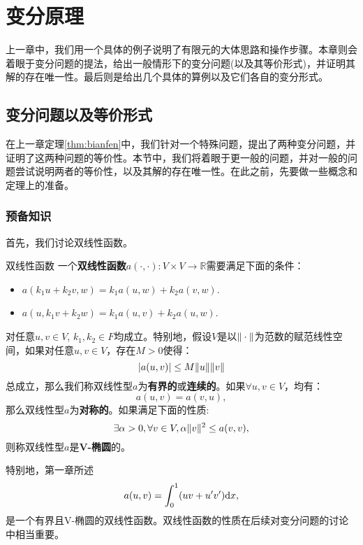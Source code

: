 
\chapter{变分原理}
上一章中，我们用一个具体的例子说明了有限元的大体思路和操作步骤。本章则会着眼于变分问题的提法，给出一般情形下的变分问题(以及其等价形式)，并证明其解的存在唯一性。最后则是给出几个具体的算例以及它们各自的变分形式。
\section{变分问题以及等价形式}
在上一章定理\ref{thm:bianfen}中，我们针对一个特殊问题，提出了两种变分问题，并证明了这两种问题的等价性。本节中，我们将着眼于更一般的问题，并对一般的问题尝试说明两者的等价性，以及其解的存在唯一性。在此之前，先要做一些概念和定理上的准备。
\subsection{预备知识}
首先，我们讨论双线性函数。
\begin{definition}{双线性函数}
  一个\textbf{双线性函数}$a(\cdot,\cdot):V\times V\rightarrow\mathbb{R}$需要满足下面的条件：
  \begin{itemize}
    \item $a(k_{1}u+k_{2}v,w)=k_{1}a(u,w)+k_{2}a(v,w)$.
    \item $a(u,k_{1}v+k_{2}w)=k_{1}a(u,v)+k_{2}a(u,w)$.
  \end{itemize}
  对任意$u,v\in V$, $k_{1},k_{2}\in F$均成立。特别地，假设$V$是以$\|\cdot\|$为范数的赋范线性空间，如果对任意$u,v\in V$，存在$M>0$使得：
  \begin{equation}
    \label{eq:bddbilinear}
    |a(u,v)|\le M\|u\|\|v\|
  \end{equation}
  总成立，那么我们称双线性型$a$为\textbf{有界的}或\textbf{连续的}。如果$\forall u,v\in V$，均有：
  \begin{equation}
    \label{eq:symmetrybilinear}
    a(u,v)=a(v,u),
  \end{equation}
  那么双线性型$a$为\textbf{对称的}。如果满足下面的性质:
  \begin{equation}
    \label{eq:Vellipticbilinear}
    \exists\alpha>0,\forall v\in V, \alpha\|v\|^{2}\le a(v,v),
  \end{equation}
  则称双线性型$a$是\textbf{V-椭圆}的。
\end{definition}
特别地，第一章所述
\begin{equation}
  \label{eq:specialbilinear}
  a(u,v)=\int_{0}^{1}(uv+u'v')\mathrm{d} x,
\end{equation}
是一个有界且V-椭圆的双线性函数。双线性函数的性质在后续对变分问题的讨论中相当重要。

